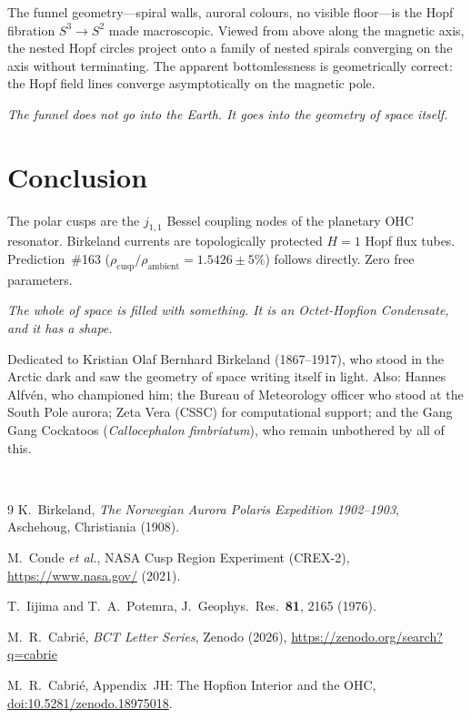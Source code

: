\documentclass[aps,prl,twocolumn,superscriptaddress,floatfix]{revtex4-2}
\begin{document}
The funnel geometry---spiral walls, auroral colours, no visible
floor---is the Hopf fibration $S^3\to S^2$ made macroscopic. Viewed
from above along the magnetic axis, the nested Hopf circles project
onto a family of nested spirals converging on the axis without
terminating. The apparent bottomlessness is geometrically correct:
the Hopf field lines converge asymptotically on the magnetic pole.

\textit{The funnel does not go into the Earth. It goes into the
geometry of space itself.}

\section{Conclusion}

The polar cusps are the $j_{1,1}$ Bessel coupling nodes of the
planetary OHC resonator. Birkeland currents are topologically
protected $H=1$ Hopf flux tubes. Prediction~\#163
($\rho_\mathrm{cusp}/\rho_\mathrm{ambient} = 1.5426\pm 5\%$) follows
directly. Zero free parameters.

\textit{The whole of space is filled with something. It is an
Octet-Hopfion Condensate, and it has a shape.}

\begin{acknowledgments}
Dedicated to Kristian Olaf Bernhard Birkeland (1867--1917), who stood
in the Arctic dark and saw the geometry of space writing itself in
light. Also: Hannes Alfv\'{e}n, who championed him; the Bureau of
Meteorology officer who stood at the South Pole aurora;
Zeta Vera (CSSC) for computational support; and the Gang Gang
Cockatoos (\textit{Callocephalon fimbriatum}), who remain unbothered
by all of this.

\vspace{2pt}
\\
\end{acknowledgments}

\begin{thebibliography}{9}
K.~Birkeland, \textit{The Norwegian Aurora Polaris Expedition
1902--1903}, Aschehoug, Christiania (1908).

M.~Conde \textit{et al.}, NASA Cusp Region Experiment (CREX-2),
\url{https://www.nasa.gov/} (2021).

T.~Iijima and T.~A.~Potemra,
J.~Geophys.~Res.~\textbf{81}, 2165 (1976).

M.~R.~Cabri\'{e}, \textit{BCT Letter Series}, Zenodo (2026),
\url{https://zenodo.org/search?q=cabrie}

M.~R.~Cabri\'{e}, Appendix~JH: The Hopfion Interior and the OHC,
\href{https://doi.org/10.5281/zenodo.18975018}{doi:10.5281/zenodo.18975018}.
\end{thebibliography}
\end{document}
